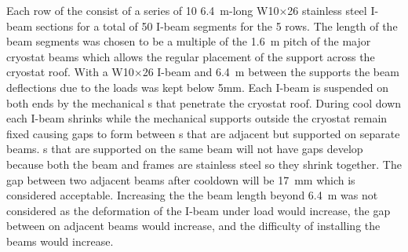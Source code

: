 Each row of the  consist of a series of \num{10} \SI{6.4}{m}-long
W10$\times$26 stainless steel I-beam sections for a total of \num{50} I-beam segments for the 5 rows. The length of the beam segments was chosen to be a multiple of the \SI{1.6}{m} pitch of the major cryostat beams which allows the regular placement of the support \fdth across the cryostat roof. With a W10$\times$26 I-beam and \SI{6.4}{m} between the supports the beam deflections due to the loads was kept below 5mm. 
Each I-beam is suspended on both ends by the mechanical \fdth{}s that penetrate the cryostat roof. 
During cool down  each I-beam shrinks while the mechanical supports outside the cryostat remain fixed  causing gaps to form between s that are adjacent but supported on separate beams.
s that are supported on the same beam will not have gaps develop because both the beam and  frames are stainless steel so they shrink together.
The gap between two adjacent  beams after cooldown will be \SI{17}{mm} which is considered acceptable. 
Increasing the the beam length beyond \SI{6.4}{m} was not considered as the deformation of the I-beam under load would increase, the gap between  on adjacent beams would increase, and the difficulty of installing the beams would increase.


